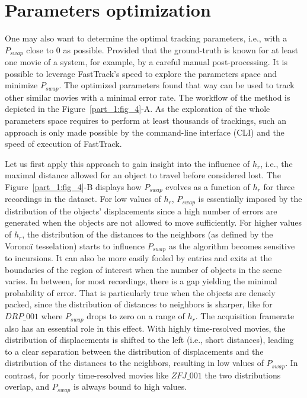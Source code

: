     \section{Parameters optimization}
    One may also want to determine the optimal tracking parameters, i.e., with a $P_{swap}$ close to 0 as possible. Provided that the ground-truth is known for at least one movie of a system, for example, by a careful manual post-processing. It is possible to leverage FastTrack's speed to explore the parameters space and minimize $P_{swap}$. The optimized parameters found that way can be used to track other similar movies with a minimal error rate. The workflow of the method is depicted in the Figure~\ref{part_1:fig_4}-A. As the exploration of the whole parameters space requires to perform at least thousands of trackings, such an approach is only made possible by the command-line interface (CLI) and the speed of execution of FastTrack.

    Let us first apply this approach to gain insight into the influence of $h_r$, i.e., the maximal distance allowed for an object to travel before considered lost. The Figure~\ref{part_1:fig_4}-B displays how $P_{swap}$ evolves as a function of $h_r$ for three recordings in the dataset. For low values of $h_r$, $P_{swap}$ is essentially imposed by the distribution of the objects' displacements since a high number of errors are generated when the objects are not allowed to move sufficiently. For higher values of $h_r$, the distribution of the distances to the neighbors (as defined by the Voronoï tesselation) starts to influence $P_{swap}$ as the algorithm becomes sensitive to incursions. It can also be more easily fooled by entries and exits at the boundaries of the region of interest when the number of objects in the scene varies.
    In between, for most recordings, there is a gap yielding the minimal probability of error. That is particularly true when the objects are densely packed, since the distribution of distances to neighbors is sharper, like for $DRP\_001$ where $P_{swap}$ drops to zero on a range of $h_r$. The acquisition framerate also has an essential role in this effect. With highly time-resolved movies, the distribution of displacements is shifted to the left (i.e., short distances), leading to a clear separation between the distribution of displacements and the distribution of the distances to the neighbors, resulting in low values of $P_{swap}$. In contrast, for poorly time-resolved movies like $ZFJ\_001$ the two distributions overlap, and $P_{swap}$ is always bound to high values.

